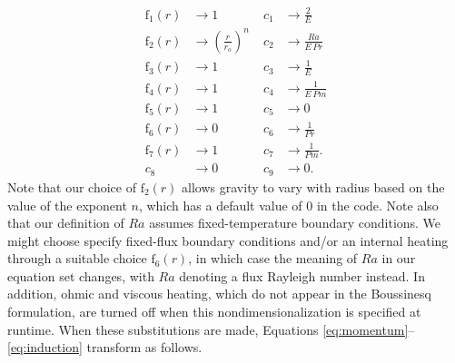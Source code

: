 \documentclass[10pt, letterpaper]{article}
\newcommand{\ff}{\mathrm{f}}
\begin{document}
\begin{align*}
\ff_1(r) &\rightarrow 1\; &c_1 &\rightarrow \frac{2}{E} \\
\ff_2(r) &\rightarrow \left(\frac{r}{r_o}\right)^n \; &c_2 &\rightarrow \frac{Ra}{E\,Pr} \\
\ff_3(r) &\rightarrow 1\; &c_3 &\rightarrow \frac{1}{E}\\
\ff_4(r) &\rightarrow 1\; &c_4 &\rightarrow \frac{1}{E\,Pm} \\
\ff_5(r) &\rightarrow 1\; &c_5 &\rightarrow 0 \\
\ff_6(r) &\rightarrow 0\; &c_6 &\rightarrow \frac{1}{Pr}  \\
\ff_7(r) &\rightarrow 1\; &c_7 &\rightarrow \frac{1}{Pm}. \\
c_8&\rightarrow 0 &c_9 &\rightarrow 0.
\end{align*}
Note that our choice of $\ff_2(r)$ allows gravity to vary with radius based on the value of the exponent $n$, which has a default value of 0 in the code.  Note also that our definition of $Ra$ assumes fixed-temperature boundary conditions.  We might choose specify fixed-flux boundary conditions and/or an internal heating through a suitable choice $\ff_6(r)$, in which case the meaning of $Ra$ in our equation set changes, with $Ra$ denoting a flux Rayleigh number instead.  In addition, ohmic and viscous heating, which do not appear in the Boussinesq formulation, are turned off when this nondimensionalization is specified at runtime.   When these substitutions are made, Equations \ref{eq:momentum}--\ref{eq:induction} transform as follows.
\end{document}
